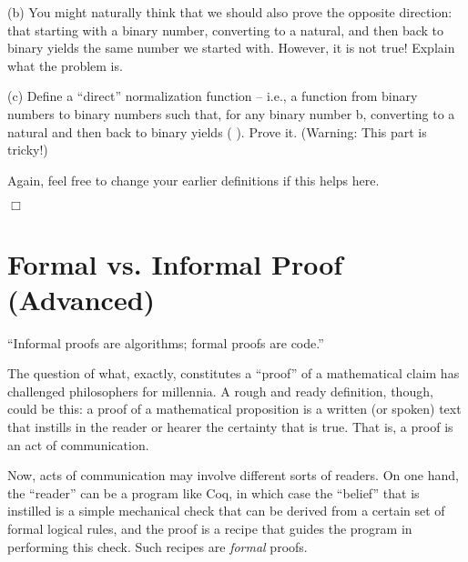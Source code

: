 \documentclass[12pt]{report}
\begin{document}
    (b) You might naturally think that we should also prove the
        opposite direction: that starting with a binary number,
        converting to a natural, and then back to binary yields the
        same number we started with.  However, it is not true!
        Explain what the problem is.


    (c) Define a ``direct'' normalization function -- i.e., a function
         from binary numbers to binary numbers such that,
        for any binary number b, converting to a natural and then back
        to binary yields ( ).  Prove it.  (Warning: This
        part is tricky!)


    Again, feel free to change your earlier definitions if this helps
    here. 
\begin{coqdoccode}
\coqdocemptyline
\end{coqdoccode}
\ensuremath{\Box} \begin{coqdoccode}
\coqdocemptyline
\end{coqdoccode}
\section{Formal vs. Informal Proof (Advanced)}



 ``Informal proofs are algorithms; formal proofs are code.'' 

 The question of what, exactly, constitutes a ``proof'' of a
    mathematical claim has challenged philosophers for millennia.  A
    rough and ready definition, though, could be this: a proof of a
    mathematical proposition  is a written (or spoken) text that
    instills in the reader or hearer the certainty that  is true.
    That is, a proof is an act of communication.


    Now, acts of communication may involve different sorts of readers.
    On one hand, the ``reader'' can be a program like Coq, in which case
    the ``belief'' that is instilled is a simple mechanical check that
     can be derived from a certain set of formal logical rules, and
    the proof is a recipe that guides the program in performing this
    check.  Such recipes are \textit{formal} proofs.
\end{document}
